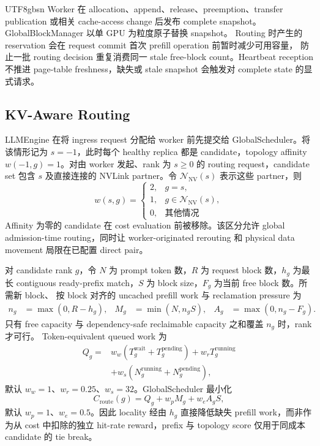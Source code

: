 \documentclass[11pt,a4paper]{article}
\begin{document}
\begin{CJK*}{UTF8}{gbsn}
Worker 在 allocation、append、release、preemption、transfer publication 或相关 cache-access
change 后发布 complete snapshot。GlobalBlockManager 以单 GPU 为粒度原子替换 snapshot。
Routing 时产生的 reservation 会在 request commit 首次 prefill operation 前暂时减少可用容量，
防止一批 routing decision 重复消费同一 stale free-block count。Heartbeat reception 不推进
page-table freshness，缺失或 stale snapshot 会触发对 complete state 的显式请求。

\subsection{KV-Aware Routing}

LLMEngine 在将 ingress request 分配给 worker 前先提交给 GlobalScheduler。将该情形记为
$s=-1$，此时每个 healthy replica 都是 candidate，topology affinity $w(-1,g)=1$。对由
worker 发起、rank 为 $s\geq0$ 的 routing request，candidate set 包含 $s$ 及直接连接的
NVLink partner。令 $\mathcal{N}_{\mathrm{NV}}(s)$ 表示这些 partner，则
\begin{equation}
 w(s,g)=
 \begin{cases}
 2, & g=s,\\
 1, & g\in\mathcal{N}_{\mathrm{NV}}(s),\\
 0, & \text{其他情况}
 \end{cases}
\end{equation}
Affinity 为零的 candidate 在 cost evaluation 前被移除。该区分允许 global admission-time
routing，同时让 worker-originated rerouting 和 physical data movement 局限在已配置 direct pair。

对 candidate rank $g$，令 $N$ 为 prompt token 数，$R$ 为 request block 数，$h_g$ 为最长
contiguous ready-prefix match，$S$ 为 block size，$F_g$ 为当前 free block 数。所需新 block、
按 block 对齐的 uncached prefill work 与 reclamation pressure 为
\begin{align}
 n_g &= \max(0,R-h_g), & M_g &= \min(N,n_gS), & A_g &= \max(0,n_g-F_g).
\end{align}
只有 free capacity 与 dependency-safe reclaimable capacity 之和覆盖 $n_g$ 时，rank 才可行。
Token-equivalent queued work 为
\begin{equation}
\begin{aligned}
 Q_g ={}& w_w(T_g^{\mathrm{wait}}+T_g^{\mathrm{pending}})
          + w_rT_g^{\mathrm{running}} \\
        &+ w_s(N_g^{\mathrm{running}}+N_g^{\mathrm{pending}}),
\end{aligned}
\end{equation}
默认 $w_w=1$、$w_r=0.25$、$w_s=32$。GlobalScheduler 最小化
\begin{equation}
 C_{\mathrm{route}}(g) = Q_g + w_pM_g + w_eA_gS,
\end{equation}
默认 $w_p=1$、$w_e=0.5$。因此 locality 经由 $h_g$ 直接降低缺失 prefill work，而非作为从
cost 中扣除的独立 hit-rate reward，prefix 与 topology score 仅用于同成本 candidate 的 tie break。


\end{CJK*}
\end{document}
